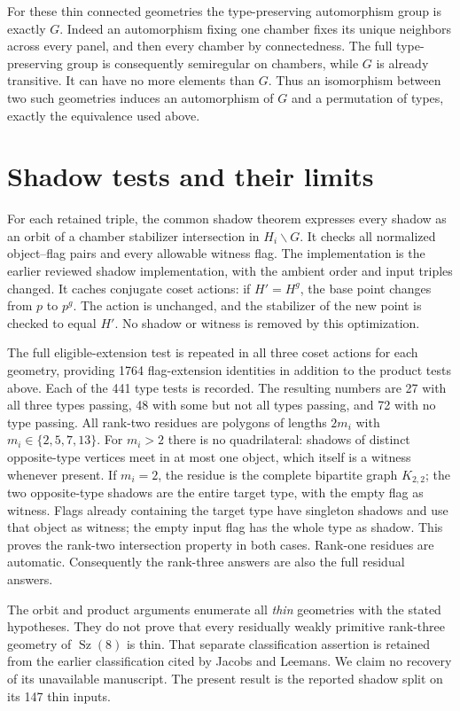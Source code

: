 For these thin connected geometries the type-preserving automorphism
group is exactly $G$. Indeed an automorphism fixing one chamber fixes its
unique neighbors across every panel, and then every chamber by connectedness.
The full type-preserving group is consequently semiregular on chambers,
while $G$ is already transitive. It can have no more elements than $G$.
Thus an isomorphism between two such geometries induces an automorphism
of $G$ and a permutation of types, exactly the equivalence used above.

\section*{Shadow tests and their limits}
For each retained triple, the common shadow theorem expresses every
shadow as an orbit of a chamber stabilizer intersection in $H_i\backslash G$.
It checks all normalized object--flag pairs and every allowable witness
flag. The implementation is the earlier reviewed shadow implementation,
with the ambient order and input triples changed. It caches conjugate
coset actions: if $H'=H^g$, the base point changes from $p$ to $p^g$.
The action is unchanged, and the stabilizer of the new point is checked
to equal $H'$. No shadow or witness is removed by this optimization.

The full eligible-extension test is repeated in all three coset actions
for each geometry, providing 1764 flag-extension identities in addition
to the product tests above. Each of the 441 type tests is recorded.
The resulting numbers are 27 with all three types passing, 48 with some
but not all types passing, and 72 with no type passing. All rank-two
residues are polygons of lengths $2m_i$ with $m_i\in\{2,5,7,13\}$.
For $m_i>2$ there is no quadrilateral: shadows of distinct opposite-type
vertices meet in at most one object, which itself is a witness whenever
present. If $m_i=2$, the residue is the complete bipartite graph $K_{2,2}$;
the two opposite-type shadows are the entire target type, with the empty
flag as witness. Flags already containing the target type have singleton
shadows and use that object as witness; the empty input flag has the
whole type as shadow. This proves the rank-two intersection property in
both cases. Rank-one residues are automatic.
Consequently the rank-three answers are also the full residual answers.

The orbit and product arguments enumerate all \emph{thin} geometries
with the stated hypotheses. They do not prove that every residually
weakly primitive rank-three geometry of $\operatorname{Sz}(8)$ is thin.
That separate classification assertion is retained from the earlier
classification cited by Jacobs and Leemans. We claim no recovery of its
unavailable manuscript. The present result is the reported shadow split
on its 147 thin inputs.

